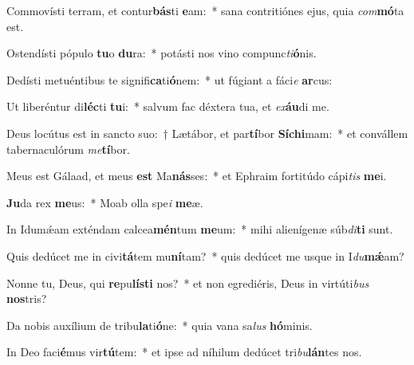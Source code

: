 \item Commovísti terram, et contur\textbf{bás}ti \textbf{e}am:~* sana contritiónes ejus, quia \textit{com}\textbf{mó}ta est.
\item Ostendísti pópulo \textbf{tu}o \textbf{du}ra:~* potásti nos vino compunc\textit{ti}\textbf{ó}nis.
\item Dedísti metuéntibus te signifi\textbf{ca}ti\textbf{ó}nem:~* ut fúgiant a fáci\textit{e} \textbf{ar}cus:
\item Ut liberéntur di\textbf{léc}ti \textbf{tu}i:~* salvum fac déxtera tua, et \textit{ex}\textbf{áu}di me.
\item Deus locútus est in sancto suo:~† Lætábor, et par\textbf{tí}bor \textbf{Sí}\textbf{chi}mam:~* et convállem tabernaculórum \textit{me}\textbf{tí}bor.
\item Meus est Gálaad, et meus \textbf{est} Ma\textbf{nás}ses:~* et Ephraim fortitúdo cápi\textit{tis} \textbf{me}i.
\item \textbf{Ju}da rex \textbf{me}us:~* Moab olla spe\textit{i} \textbf{me}æ.
\item In Idumǽam exténdam calcea\textbf{mén}tum \textbf{me}um:~* mihi alienígenæ súb\textit{di}\textbf{ti} sunt.
\item Quis dedúcet me in civi\textbf{tá}tem mu\textbf{ní}tam?~* quis dedúcet me usque in I\textit{du}\textbf{mǽ}am?
\item Nonne tu, Deus, qui \textbf{re}pu\textbf{lís}\textbf{ti} nos?~* et non egrediéris, Deus in virtúti\textit{bus} \textbf{nos}tris?
\item Da nobis auxílium de tribu\textbf{la}ti\textbf{ó}ne:~* quia vana sa\textit{lus} \textbf{hó}minis.
\item In Deo faci\textbf{é}mus vir\textbf{tú}tem:~* et ipse ad níhilum dedúcet tri\textit{bu}\textbf{lán}tes nos.
